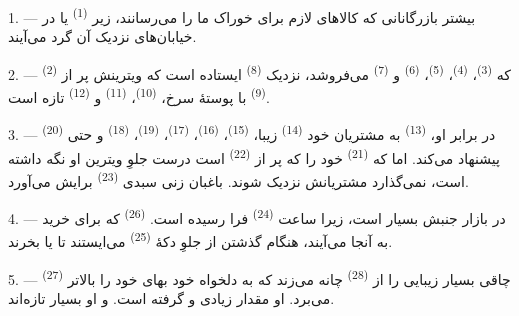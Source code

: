 \VUsaut{4.0mm}
\VUsaut{3.0mm}

\VUsaut{3.0mm}

1. --- بیشتر بازرگانانی که کالاهای لازم برای خوراک ما را می‌رسانند،
زیر  \textsuperscript{(1)}  یا در
خیابان‌های نزدیک آن گرد می‌آیند.

2. ---  \textsuperscript{(2)} که 
\textsuperscript{(3)}،  \textsuperscript{(4)}،
 \textsuperscript{(5)}، 
\textsuperscript{(6)} و  \textsuperscript{(7)}
می‌فروشد، نزدیک  \textsuperscript{(8)} ایستاده
است که ویترینش پر از  \textsuperscript{(9)} با
پوستهٔ سرخ،  \textsuperscript{(10)}،
 \textsuperscript{(11)} و 
\textsuperscript{(12)} تازه است.

3. --- در برابر او،  \textsuperscript{(13)} به
مشتریان خود  \textsuperscript{(14)} زیبا،
 \textsuperscript{(15)}، 
\textsuperscript{(16)}،  \textsuperscript{(17)}،
 \textsuperscript{(19)}، 
\textsuperscript{(18)} و حتی  \textsuperscript{(20)}
پیشنهاد می‌کند. اما  که 
\textsuperscript{(21)} خود را که پر از 
\textsuperscript{(22)} است درست جلوِ ویترین او نگه داشته است، نمی‌گذارد
مشتریانش نزدیک شوند. باغبان زنی سبدی 
\textsuperscript{(23)} برایش می‌آورد.

\VUsaut{4.0mm}
\VUsaut{3.0mm}

4. --- در بازار جنبش بسیار است، زیرا ساعت 
\textsuperscript{(24)} فرا رسیده است. 
\textsuperscript{(26)} که برای خرید به آنجا می‌آیند، هنگام گذشتن از
جلوِ دکهٔ  \textsuperscript{(25)} می‌ایستند تا
 یا  بخرند.

5. ---  \textsuperscript{(27)} چاقی  بسیار
زیبایی را از  \textsuperscript{(28)} چانه می‌زند که
به دلخواه خود بهای خود را بالاتر می‌برد. او مقدار زیادی
 و  گرفته است.
 و  او بسیار تازه‌اند.

